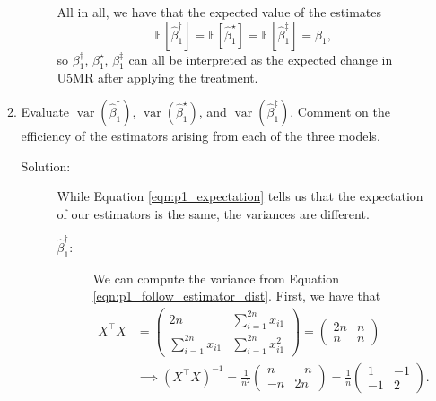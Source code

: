 \documentclass[letterpaper,11pt]{article}
\begin{document}
\begin{enumerate}
\begin{enumerate}
\begin{description}
      All in all, we have that the expected value of the estimates
      \begin{equation}
        \mathbb{E}\left[\hat{\beta}^\dagger_1\right] =
        \mathbb{E}\left[\hat{\beta}^\star_1\right] = 
        \mathbb{E}\left[\hat{\beta}_1^\ddagger\right] =
        \beta_1,
        \label{eqn:p1_expectation}
      \end{equation}
      so $\beta_1^\dagger$, $\beta_1^\star$, $\beta_1^\ddagger$ can all be
      interpreted as the expected change in U5MR after applying the treatment.
    \end{description}
  \item Evaluate $\operatorname{var}\left(\hat{\beta}_1^\dagger\right)$,
    $\operatorname{var}\left(\hat{\beta}_1^\star\right)$, and
    $\operatorname{var}\left(\hat{\beta}_1^\ddagger\right)$. Comment on the
    efficiency of the estimators arising from each of the three models.
    \label{part:p1_variance}
    \begin{description}
    \item[Solution:] While Equation \ref{eqn:p1_expectation} tells us that the
      expectation of our estimators is the same, the variances are different.

      \begin{description}
      \item[$\hat{\beta}_1^\dagger$:] We can compute the variance from Equation
        \ref{eqn:p1_follow_estimator_dist}. First, we have that
        \begin{align}
          X^\intercal X
          &= \begin{pmatrix}
            2n & \sum_{i=1}^{2n} x_{i1}  \\
            \sum_{i=1}^{2n} x_{i1} & \sum_{i=1}^{2n} x_{i1}^2
          \end{pmatrix} = \begin{pmatrix}
            2n & n  \\
            n & n
          \end{pmatrix} \nonumber\\
          &\implies \left(X^\intercal X\right)^{-1}
            = \frac{1}{n^2}\begin{pmatrix}
              n & -n \\
              -n & 2n
            \end{pmatrix} = \frac{1}{n}\begin{pmatrix}
              1 & -1 \\
              -1 & 2
            \end{pmatrix}. \label{eqn:p1_inverse_gramian}
        \end{align}


\end{description}
\end{description}
\end{enumerate}
\end{enumerate}
\end{document}
